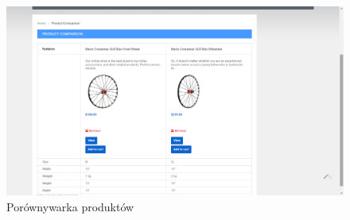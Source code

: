 \begin{figure}[h!]
  \centering
    \includegraphics[width=\textwidth]{graphics/ui/ProductComparison.png}
  \caption{Porównywarka produktów}
\end{figure}